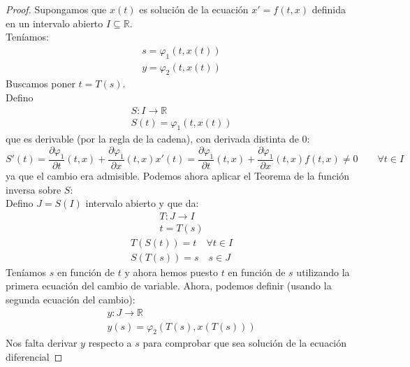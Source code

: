 \begin{proof}
    Supongamos que $x(t)$ es solución de la ecuación $x'=f(t,x)$ definida en un intervalo abierto $I\subseteq \mathbb{R}$.\\

    Teníamos:
    \begin{gather*}
        s = \varphi_1(t,x(t)) \\
        y = \varphi_2(t,x(t))
    \end{gather*}
    Buscamos poner $t = T(s)$.\\

    Defino
    \begin{gather*}
        S:I\rightarrow\mathbb{R} \\
        S(t) = \varphi_1(t,x(t))
    \end{gather*}
    que es derivable (por la regla de la cadena), con derivada distinta de 0:
    \begin{equation*}
        S'(t) = \dfrac{\partial\varphi_1}{\partial t}(t,x) + \dfrac{\partial\varphi_1}{\partial x}(t,x)x'(t) = \dfrac{\partial\varphi_1}{\partial t}(t,x) + \dfrac{\partial\varphi_1}{\partial x}(t,x)f(t,x) \neq 0 \qquad \forall t\in I
    \end{equation*}
    ya que el cambio era admisible. Podemos ahora aplicar el Teorema de la función inversa sobre $S$:\\

    Defino $J=S(I)$ intervalo abierto y que da:
    \begin{gather*}
        T:J\rightarrow I \\
        t = T(s)
    \end{gather*}
    \begin{gather*}
        T(S(t)) = t \quad \forall t\in I \\
        S(T(s)) = s \quad s\in J
    \end{gather*}
    Teníamos $s$ en función de $t$ y ahora hemos puesto $t$ en función de $s$ utilizando la primera ecuación del cambio de variable. Ahora, podemos definir (usando la segunda ecuación del cambio):
    \begin{gather*}
        y:J\rightarrow\mathbb{R} \\
        y(s) = \varphi_2(T(s),x(T(s)))
    \end{gather*}
    Nos falta derivar $y$ respecto a $s$ para comprobar que sea solución de la ecuación diferencial %


\end{proof}
